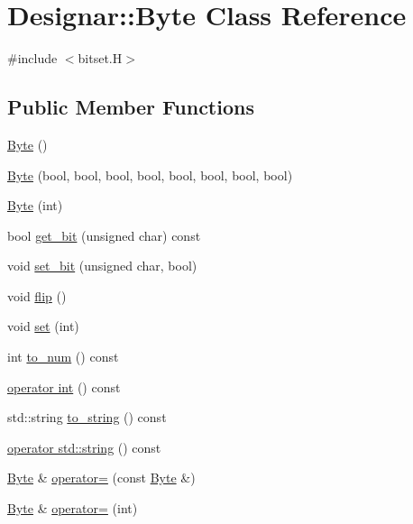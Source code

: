 \hypertarget{class_designar_1_1_byte}{}\section{Designar\+:\+:Byte Class Reference}
\label{class_designar_1_1_byte}


{\ttfamily \#include $<$bitset.\+H$>$}

\subsection*{Public Member Functions}
\begin{DoxyCompactItemize}
\item 
\hyperlink{class_designar_1_1_byte_a336815c676347de4aa09bc6342169f63}{Byte} ()
\item 
\hyperlink{class_designar_1_1_byte_a21d54a921b6f2e30c189ae2998c40188}{Byte} (bool, bool, bool, bool, bool, bool, bool, bool)
\item 
\hyperlink{class_designar_1_1_byte_a0ca92bbee262c55827eb6b2c1ebaa39e}{Byte} (int)
\item 
bool \hyperlink{class_designar_1_1_byte_a9f14a28a82353d48a802000c6de20c8e}{get\+\_\+bit} (unsigned char) const
\item 
void \hyperlink{class_designar_1_1_byte_a2d80ae64ad8316128d9217134f075721}{set\+\_\+bit} (unsigned char, bool)
\item 
void \hyperlink{class_designar_1_1_byte_abb173606939fe9f5e1c7db0180aba9b0}{flip} ()
\item 
void \hyperlink{class_designar_1_1_byte_a4e4336c19295313fc80e27ce40a69284}{set} (int)
\item 
int \hyperlink{class_designar_1_1_byte_a1f10a6e5ad399f62c0d53ace68c7e43d}{to\+\_\+num} () const
\item 
\hyperlink{class_designar_1_1_byte_a807f2afe5c5d15112b2a349e54142265}{operator int} () const
\item 
std\+::string \hyperlink{class_designar_1_1_byte_afddf5962874234208805ece07f31916d}{to\+\_\+string} () const
\item 
\hyperlink{class_designar_1_1_byte_ac37e3eaea04d1bdb09b04a1dd94a852d}{operator std\+::string} () const
\item 
\hyperlink{class_designar_1_1_byte}{Byte} \& \hyperlink{class_designar_1_1_byte_ab139736eebd931cb54f89fa2b01964fb}{operator=} (const \hyperlink{class_designar_1_1_byte}{Byte} \&)
\item 
\hyperlink{class_designar_1_1_byte}{Byte} \& \hyperlink{class_designar_1_1_byte_a1bc5154efe3f2ca906bbdd8c1d9b56ff}{operator=} (int)

\end{DoxyCompactItemize}
